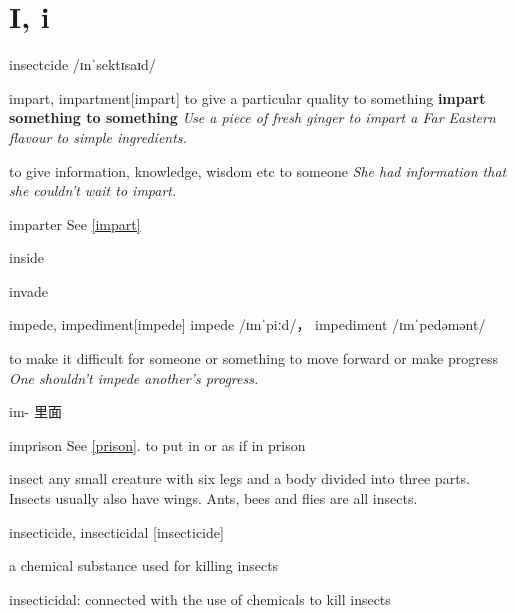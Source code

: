 \section{I, i}

\begin{DefWord}{insectcide}
    /ɪnˈsektɪsaɪd/
\end{DefWord}

\begin{DefWord}{impart, impartment}[impart]
    to give a particular quality to something
    \textbf{impart something to something}
    \textit{Use a piece of fresh ginger to impart a Far Eastern flavour to simple ingredients.}

    to give information, knowledge, wisdom etc to someone
    \textit{She had information that she couldn’t wait to impart.}
\end{DefWord}

\begin{DefWord}{imparter}
    See \ref{impart}
\end{DefWord}

\begin{DefWord}{inside}
\end{DefWord}

\begin{DefWord}{invade}
\end{DefWord}

\begin{DefWord}{impede, impediment}[impede]
    impede /ɪmˈpiːd/， impediment /ɪmˈpedəmənt/ 

    to make it difficult for someone or something to move forward or make progress
    \textit{One shouldn't impede another's progress.}

    im- 里面
\end{DefWord}

\begin{DefWord}{imprison}
    See \ref{prison}.
    to put in or as if in prison
\end{DefWord}

\begin{DefWord}{insect}
    any small creature with six legs and a body divided into three parts. Insects usually also have wings. Ants, bees and flies are all insects.
\end{DefWord}

\begin{DefWord}{insecticide,  insecticidal }[insecticide]

    a chemical substance used for killing insects

    insecticidal: connected with the use of chemicals to kill insects 
\end{DefWord}

